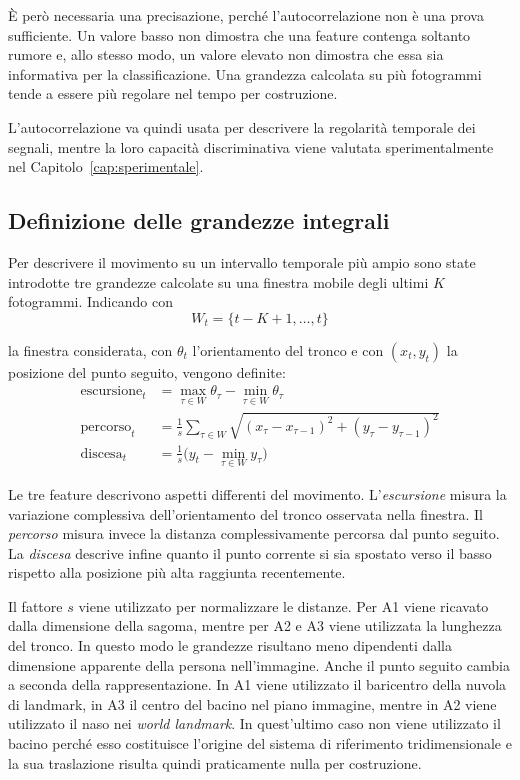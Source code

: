 È però necessaria una precisazione, perché l'autocorrelazione non è una prova sufficiente. Un valore basso non dimostra che una feature contenga soltanto rumore e, allo stesso modo, un valore elevato non dimostra che essa sia informativa per la classificazione. Una grandezza calcolata su più fotogrammi tende a essere più regolare nel tempo per costruzione.

L'autocorrelazione va quindi usata per descrivere la regolarità temporale dei segnali, mentre la loro capacità discriminativa viene valutata sperimentalmente nel Capitolo~\ref{cap:sperimentale}.

\subsection{Definizione delle grandezze integrali}

Per descrivere il movimento su un intervallo temporale più ampio sono state introdotte tre grandezze calcolate su una finestra mobile degli ultimi \(K\) fotogrammi. Indicando con
\[
W_t=\{t-K+1,\ldots,t\}
\]

la finestra considerata, con \(\theta_t\) l'orientamento del tronco e con \((x_t,y_t)\) la posizione del punto seguito, vengono definite:
\begin{align}
\text{escursione}_t &= \max_{\tau \in W} \theta_\tau
                     - \min_{\tau \in W} \theta_\tau
                     \label{eq:escursione}\\[4pt]
\text{percorso}_t   &= \frac{1}{s}\sum_{\tau \in W}
                       \sqrt{(x_\tau - x_{\tau-1})^2 + (y_\tau - y_{\tau-1})^2}
                     \label{eq:percorso}\\[4pt]
\text{discesa}_t    &= \frac{1}{s}\Big( y_t - \min_{\tau \in W} y_\tau \Big)
                     \label{eq:discesa}
\end{align}

Le tre feature descrivono aspetti differenti del movimento. L'\emph{escursione} misura la variazione complessiva dell'orientamento del tronco osservata nella finestra. Il \emph{percorso} misura invece la distanza complessivamente percorsa dal punto seguito. La \emph{discesa} descrive infine quanto il punto corrente si sia spostato verso il basso rispetto alla posizione più alta raggiunta recentemente.

Il fattore \(s\) viene utilizzato per normalizzare le distanze. Per A1 viene ricavato dalla dimensione della sagoma, mentre per A2 e A3 viene utilizzata la lunghezza del tronco. In questo modo le grandezze risultano meno dipendenti dalla dimensione apparente della persona nell'immagine. Anche il punto seguito cambia a seconda della rappresentazione. In A1 viene utilizzato il baricentro della nuvola di landmark, in A3 il centro del bacino nel piano immagine, mentre in A2 viene utilizzato il naso nei \emph{world landmark}. In quest'ultimo caso non viene utilizzato il bacino perché esso costituisce l'origine del sistema di riferimento tridimensionale e la sua traslazione risulta quindi praticamente nulla per costruzione.

